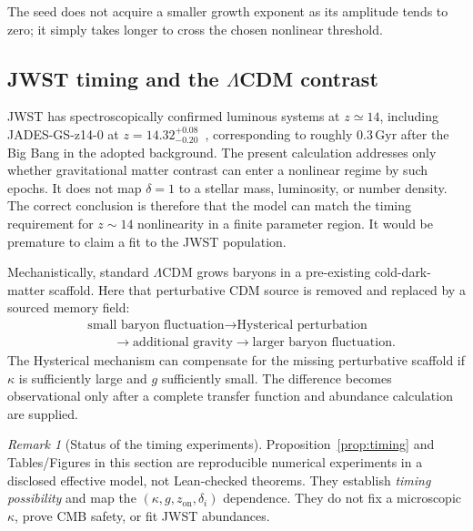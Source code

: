 \documentclass[11pt]{article}
\theoremstyle{definition}
\theoremstyle{remark}
\newtheorem{remark}[theorem]{Remark}
\begin{document}
The seed does not acquire a smaller growth exponent as its amplitude tends to zero; it simply takes longer to cross the chosen nonlinear threshold.

\subsection{JWST timing and the $\Lambda$CDM contrast}
JWST has spectroscopically confirmed luminous systems at $z\simeq14$, including JADES-GS-z14-0 at $z=14.32^{+0.08}_{-0.20}$~\cite{Carniani2024}, corresponding to roughly $0.3\,\mathrm{Gyr}$ after the Big Bang in the adopted background.
The present calculation addresses only whether gravitational matter contrast can enter a nonlinear regime by such epochs.
It does not map $\delta=1$ to a stellar mass, luminosity, or number density.
The correct conclusion is therefore that the model can match the timing requirement for $z\sim14$ nonlinearity in a finite parameter region.
It would be premature to claim a fit to the JWST population.

Mechanistically, standard $\Lambda$CDM grows baryons in a pre-existing cold-dark-matter scaffold.
Here that perturbative CDM source is removed and replaced by a sourced memory field:
\[
\begin{aligned}
&\text{small baryon fluctuation}
\longrightarrow
\text{Hysterical perturbation}\\
&\qquad\longrightarrow
\text{additional gravity}
\longrightarrow
\text{larger baryon fluctuation.}
\end{aligned}
\]
The Hysterical mechanism can compensate for the missing perturbative scaffold if $\kappa$ is sufficiently large and $g$ sufficiently small.
The difference becomes observational only after a complete transfer function and abundance calculation are supplied.

\begin{remark}[Status of the timing experiments]
\label{rem:timing-status}
Proposition~\ref{prop:timing} and Tables/Figures in this section are reproducible numerical experiments in a disclosed effective model, not Lean-checked theorems.
They establish \emph{timing possibility} and map the $(\kappa,g,z_{\mathrm{on}},\delta_i)$ dependence.
They do not fix a microscopic $\kappa$, prove CMB safety, or fit JWST abundances.
\end{remark}
\end{document}
